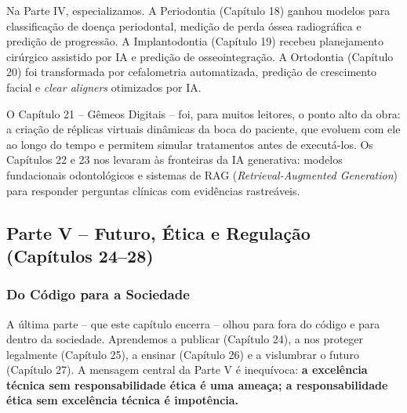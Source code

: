 Na Parte IV, especializamos. A Periodontia (Capítulo 18) ganhou modelos para
classificação de doença periodontal, medição de perda óssea radiográfica e
predição de progressão. A Implantodontia (Capítulo 19) recebeu planejamento
cirúrgico assistido por IA e predição de osseointegração. A Ortodontia
(Capítulo 20) foi transformada por cefalometria automatizada, predição de
crescimento facial e \textit{clear aligners} otimizados por IA.

O Capítulo 21 -- Gêmeos Digitais -- foi, para muitos leitores, o ponto alto
da obra: a criação de réplicas virtuais dinâmicas da boca do paciente, que
evoluem com ele ao longo do tempo e permitem simular tratamentos antes de
executá-los. Os Capítulos 22 e 23 nos levaram às fronteiras da IA generativa:
modelos fundacionais odontológicos e sistemas de RAG (\textit{Retrieval-Augmented
Generation}) para responder perguntas clínicas com evidências rastreáveis.

\subsection{Parte V -- Futuro, Ética e Regulação (Capítulos 24--28)}

\subsubsection{Do Código para a Sociedade}

A última parte -- que este capítulo encerra -- olhou para fora do código e para
dentro da sociedade. Aprendemos a publicar (Capítulo 24), a nos proteger
legalmente (Capítulo 25), a ensinar (Capítulo 26) e a vislumbrar o futuro
(Capítulo 27). A mensagem central da Parte V é inequívoca: \textbf{a excelência
técnica sem responsabilidade ética é uma ameaça; a responsabilidade ética sem
excelência técnica é impotência.}


